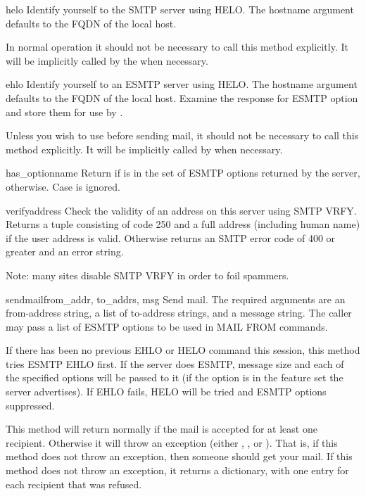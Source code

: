 \begin{methoddesc}{helo}{}
Identify yourself to the SMTP server using HELO.  The hostname
argument defaults to the FQDN of the local host.

In normal operation it should not be necessary to call this method
explicitly.  It will be implicitly called by the 
when necessary.
\end{methoddesc}

\begin{methoddesc}{ehlo}{}
Identify yourself to an ESMTP server using HELO.  The hostname
argument defaults to the FQDN of the local host.  Examine the 
response for ESMTP option and store them for use by
.

Unless you wish to use  before sending
mail, it should not be necessary to call this method explicitly.  It
will be implicitly called by  when necessary.
\end{methoddesc}

\begin{methoddesc}{has_option}{name}
Return  if  is in the set of ESMTP options returned
by the server,  otherwise.  Case is ignored.
\end{methoddesc}

\begin{methoddesc}{verify}{address}
Check the validity of an address on this server using SMTP VRFY.
Returns a tuple consisting of code 250 and a full  address
(including human name) if the user address is valid. Otherwise returns
an SMTP error code of 400 or greater and an error string.

Note: many sites disable SMTP VRFY in order to foil spammers.
\end{methoddesc}

\begin{methoddesc}{sendmail}{from_addr, to_addrs, msg}
Send mail.  The required arguments are an  from-address string,
a list of  to-address strings, and a message string.  The caller
may pass a list of ESMTP options to be used in MAIL FROM commands.

If there has been no previous EHLO or HELO command this session, this
method tries ESMTP EHLO first. If the server does ESMTP, message size
and each of the specified options will be passed to it (if the option
is in the feature set the server advertises).  If EHLO fails, HELO
will be tried and ESMTP options suppressed.

This method will return normally if the mail is accepted for at least 
one recipient. Otherwise it will throw an exception (either
, , or
).
That is, if this method does not throw an exception, then someone 
should get your mail.  If this method does not throw an exception,
it returns a dictionary, with one entry for each recipient that was 
refused.
\end{methoddesc}


